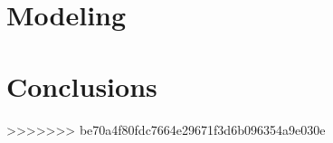 \documentclass[11pt,a4paper]{article}
\begin{document}
% 

\section{Modeling}
\label{sec:modeling}


\section{Conclusions}
\label{sec:conc}




% 

>>>>>>> be70a4f80fdc7664e29671f3d6b096354a9e030e
\end{document}
